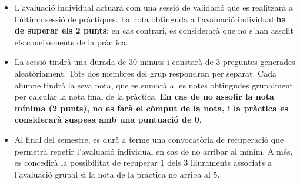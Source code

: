\documentclass[12pt,a4paper]{article}
\begin{document}
\begin{itemize}
\item L'avaluació individual actuarà com una sessió de validació que es realitzarà a l'última sessió de pràctiques. La nota obtinguda a l'avaluació individual \textbf{ha de superar els 2 punts}; en cas contrari, es considerarà que no s'han assolit els coneixements de la pràctica.

\item La sessió tindrà una durada de 30 minuts i constarà de 3 preguntes generades aleatòriament. Tots dos membres del grup respondran per separat. Cada alumne tindrà la seva nota, que es sumarà a les notes obtingudes grupalment per calcular la nota final de la pràctica. \textbf{En cas de no assolir la nota mínima (2 punts), no es farà el còmput de la nota, i la pràctica es considerarà suspesa amb una puntuació de 0}.

\item Al final del semestre, es durà a terme una convocatòria de recuperació que permetrà repetir l'avaluació individual en cas de no arribar al mínim. A més, es concedirà la possibilitat de recuperar 1 dels 3 lliuraments associats a l'avaluació grupal si la nota de la pràctica no arriba al 5.

\end{itemize}





\end{document}
